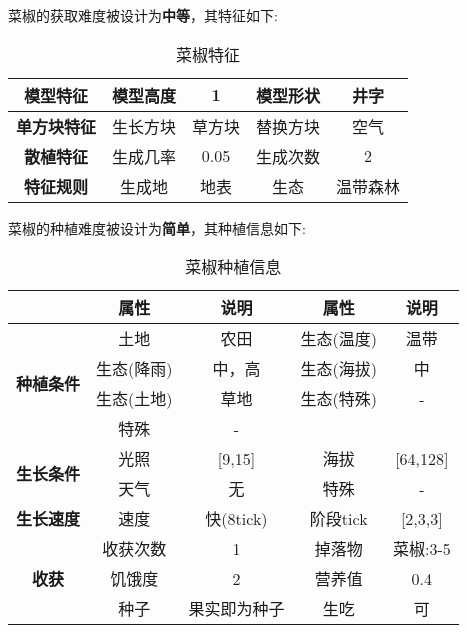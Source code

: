 菜椒的获取难度被设计为\textbf{中等}，其特征如下:
\begin{table}[H]
    \centering
    \caption{菜椒特征}
    \label{table:菜椒特征}
    \setlength{\tabcolsep}{4mm}
    \begin{tabular}{c|cc|cc}
        \toprule
        \textbf{模型特征}   & 模型高度 & 1      & 模型形状 & 井字     \\
        \midrule
        \textbf{单方块特征} & 生长方块 & 草方块 & 替换方块 & 空气     \\
        \midrule
        \textbf{散植特征}   & 生成几率 & 0.05   & 生成次数 & 2        \\
        \midrule
        \textbf{特征规则}   & 生成地   & 地表   & 生态     & 温带森林 \\
        \bottomrule
    \end{tabular}
\end{table}


菜椒的种植难度被设计为\textbf{简单}，其种植信息如下:

\begin{table}[H]
    \centering
    \caption{菜椒种植信息}
    \label{table:菜椒种植信息}
    \setlength{\tabcolsep}{4mm}
    \begin{tabular}{c|cc|cc}
        \toprule
                                           & \textbf{属性} & \textbf{说明} & \textbf{属性} & \textbf{说明} \\
        \midrule
        \multirow{4}{*}{\textbf{种植条件}} & 土地          & 农田          & 生态(温度)    & 温带    \\
                                           & 生态(降雨)    & 中，高        & 生态(海拔)    & 中            \\
                                           & 生态(土地)    & 草地          & 生态(特殊)    & -             \\
                                           & 特殊          & -                                             \\
        \midrule
        \multirow{2}{*}{\textbf{生长条件}} & 光照          & [9,15]        & 海拔          & [64,128]      \\
                                           & 天气          & 无            & 特殊          & -             \\
        \midrule
        \textbf{生长速度}                  & 速度          & 快(8tick)     & 阶段tick      & [2,3,3]       \\
        \midrule
        \multirow{3}{*}{\textbf{收获}}     & 收获次数      & 1             & 掉落物        & 菜椒:3-5      \\
                                           & 饥饿度        & 2             & 营养值        & 0.4           \\
                                           & 种子          & 果实即为种子  & 生吃          & 可   \\
        \bottomrule
    \end{tabular}
\end{table}

